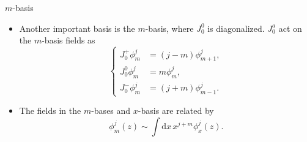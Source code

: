 \documentclass{beamer}
\begin{document}
\begin{frame}{\texorpdfstring{$m$}{Lg}-basis}
  \begin{itemize}
    \item Another important basis is the $m$-basis, where $J^{0}_{0}$ is diagonalized. 
          $J^{a}_{0}$ act on the $m$-basis fields as 
      \begin{equation}
          \left\{
              \begin{aligned}
                  J^{+}_{0} \phi^{j}_{m} &= (j-m) \phi^{j}_{m+1}, \\
                  J^{0}_{0} \phi^{j}_{m} &= m \phi^{j}_{m},\\
                  J^{-}_{0} \phi^{j}_{m} &= (j+m) \phi^{j}_{m-1}.
              \end{aligned}
          \right. \label{Diffm}
      \end{equation}
    \item The fields in the $m$-bases and $x$-basis are related by
          \begin{equation}
              \phi^{j}_{m}(z) \sim \int \mathrm{d} x \, x^{j+m} \phi^{j}_{x}(z).
          \end{equation}
  \end{itemize}
\end{frame}
\end{document}
